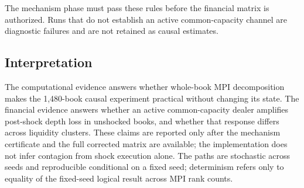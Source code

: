 The mechanism phase must pass these rules before the financial matrix is
authorized.  Runs that do not establish an active common-capacity channel are
diagnostic failures and are not retained as causal estimates.

\subsection{Interpretation}

The computational evidence answers whether whole-book MPI decomposition makes
the 1,480-book causal experiment practical without changing its state.  The
financial evidence answers whether an active common-capacity dealer amplifies
post-shock depth loss in unshocked books, and whether that
response differs across liquidity clusters.  These claims are reported only
after the mechanism certificate and the full corrected matrix are available;
the implementation does not infer contagion from shock execution alone.  The
paths are stochastic across seeds and reproducible conditional on a fixed
seed; determinism refers only to equality of the fixed-seed logical result
across MPI rank counts.


